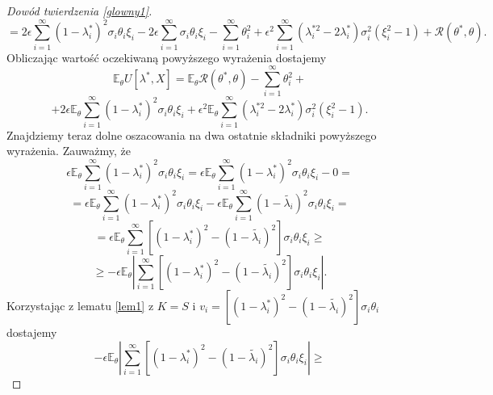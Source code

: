 \documentclass{mwart}
\begin{document}
\begin{proof}[Dowód twierdzenia \ref{glowny1}]
\begin{displaymath}
\end{displaymath}
\begin{displaymath}
=2\epsilon\sum_{i=1}^{\infty}(1-\lambda_i^*)^2\sigma_i\theta_i\xi_i-2\epsilon\sum_{i=1}^{\infty}\sigma_i\theta_i\xi_i-\sum_{i=1}^{\infty}\theta_i^2+\epsilon^2\sum_{i=1}^{\infty}(\lambda_i^{*2}-2\lambda_i^*)\sigma_i^2(\xi_i^2-1)+\mathcal{R}(\theta^*,\theta).
\end{displaymath}
Obliczając wartość oczekiwaną powyższego wyrażenia dostajemy
\begin{equation}\label{ryzyko}
\mathbb{E}_{\theta}U[\lambda^*,X]=\mathbb{E}_{\theta}\mathcal{R}(\theta^*,\theta)-\sum_{i=1}^{\infty}\theta_i^2+
\end{equation}
\begin{displaymath}
+2\epsilon\mathbb{E}_{\theta}\sum_{i=1}^{\infty}(1-\lambda_i^*)^2\sigma_i\theta_i\xi_i+\epsilon^2\mathbb{E}_{\theta}\sum_{i=1}^{\infty}(\lambda_i^{*2}-2\lambda_i^*)\sigma_i^2(\xi_i^2-1).
\end{displaymath}
Znajdziemy teraz dolne oszacowania na dwa ostatnie składniki powyższego wyrażenia. Zauważmy, że 
\begin{displaymath}
\epsilon\mathbb{E}_{\theta}\sum_{i=1}^{\infty}(1-\lambda_i^*)^2\sigma_i\theta_i\xi_i=\epsilon\mathbb{E}_{\theta}\sum_{i=1}^{\infty}(1-\lambda_i^*)^2\sigma_i\theta_i\xi_i-0=
\end{displaymath}
\begin{displaymath}
=\epsilon\mathbb{E}_{\theta}\sum_{i=1}^{\infty}(1-\lambda_i^*)^2\sigma_i\theta_i\xi_i-\epsilon\mathbb{E}_{\theta}\sum_{i=1}^{\infty}(1-\tilde{\lambda_i})^2\sigma_i\theta_i\xi_i=
\end{displaymath}
\begin{displaymath}
=\epsilon\mathbb{E}_{\theta}\sum_{i=1}^{\infty}[(1-\lambda_i^*)^2-(1-\tilde{\lambda_i})^2]\sigma_i\theta_i\xi_i\geq
\end{displaymath}
\begin{displaymath}
\geq -\epsilon\mathbb{E}_{\theta}\left|\sum_{i=1}^{\infty}[(1-\lambda_i^*)^2-(1-\tilde{\lambda_i})^2]\sigma_i\theta_i\xi_i\right|.
\end{displaymath}
Korzystając z lematu \ref{lem1} z $K=S$ i $v_i=[(1-\lambda_i^*)^2-(1-\tilde{\lambda_i})^2]\sigma_i\theta_i$ dostajemy
\begin{displaymath}
-\epsilon\mathbb{E}_{\theta}\left|\sum_{i=1}^{\infty}[(1-\lambda_i^*)^2-(1-\tilde{\lambda_i})^2]\sigma_i\theta_i\xi_i\right|\geq
\end{displaymath}
\begin{displaymath}

\end{displaymath}
\end{proof}
\end{document}
